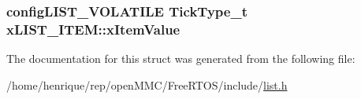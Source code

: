 \hypertarget{structxLIST__ITEM_a9b1f26de79f9da1403ca3ebc7a2e653a}{
\subsubsection[{x\-Item\-Value}]{ {\bf config\-L\-I\-S\-T\-\_\-\-V\-O\-L\-A\-T\-I\-L\-E} {\bf Tick\-Type\-\_\-t} x\-L\-I\-S\-T\-\_\-\-I\-T\-E\-M\-::x\-Item\-Value}}\label{structxLIST__ITEM_a9b1f26de79f9da1403ca3ebc7a2e653a}


The documentation for this struct was generated from the following file\-:\begin{DoxyCompactItemize}
\item 
/home/henrique/rep/open\-M\-M\-C/\-Free\-R\-T\-O\-S/include/\hyperlink{list_8h}{list.\-h}\end{DoxyCompactItemize}
